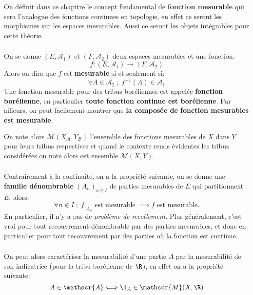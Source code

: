 \chapter*{} %
On définit dans ce chapitre le concept fondamental de \textbf{fonction mesurable} qui sera l'analogue des fonctions continues en topologie, en effet ce seront les morphismes sur les espaces mesurables. Aussi ce seront les objets intégrables pour cette théorie.

\subsection*{}
On se donne \((E, \mathscr{A}_1)\) et \((F, \mathscr{A}_2)\) deux espaces mesurables et une fonction:
\[
   f : (E, \mathscr{A}_1) \longrightarrow (F, \mathscr{A}_2)
\]
Alors on dira que \(f\) est \textbf{mesurable} si et seulement si:
\[
   \forall A \in \mathscr{A}_2 \; ; \; f^{-1}(A) \in \mathscr{A}_1
\]
Une fonction mesurable pour des tribus boréliennes est appelée \textbf{fonction borélienne}, en particulier \textbf{toute fonction continue est borélienne}. Par ailleurs, on peut facilement montrer que \textbf{la composée de fonction mesurables est mesurable}.\<

On note alors \(\mathscr{M}(X_{\mathscr{A}}, Y_{\mathscr{B}})\) l'ensemble des fonctions mesurables de \(X\) dans \(Y\) pour leurs tribus respectives et quand le contexte rends évidentes les tribus considérées on note alors cet ensemble \(\mathscr{M}(X, Y)\).
\subsection*{}
Contrairement à la continuité, on a la propriété suivante, on se donne une \textbf{famille dénombrable} \((A_n)_{n \in I}\) de parties mesurables de \(E\) qui partitionnent \(E\), alors:
\[
   \forall n \in I \; ; \; f \big|_{A_n} \text{ est mesurable } \implies f \text{ est mesurable.}
\] 
En particulier, il n'y a pas de \textit{problème de recollement}. Plus généralement, c'est vrai pour tout recouvrement dénombrable par des parties mesurables, et donc en particulier pour tout recouvrement par des parties où la fonction est continue.

\subsection*{}
On peut alors caractériser la mesurabilité d'une partie \(A\) par la mesurabilité de son indicatrice (pour la tribu borélienne de \(\R\)), en effet on a la propriété suivante:
\[
   A \in \mathscr{A} \Longleftrightarrow \1_A \in \mathscr{M}(X, \R)
\]
